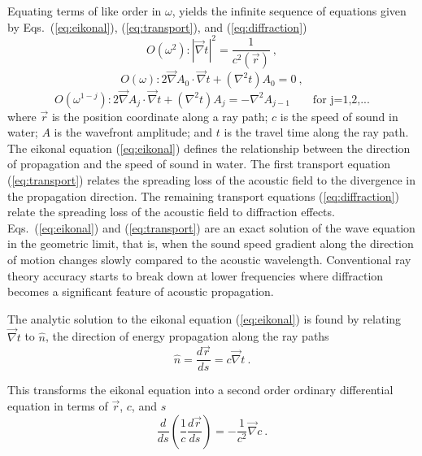\documentclass{ws-jca}
\begin{document}
Equating terms of like order in \(\omega\), yields the infinite sequence of
equations given by Eqs.~(\ref{eq:eikonal}), (\ref{eq:transport}), and
(\ref{eq:diffraction})
\begin{equation}
	O(\omega^2) : \left| \vec{\nabla}t \right|^2 = \frac{1}{c^2(\vec{r})} \:,
	\label{eq:eikonal}
\end{equation}
\begin{equation}
	O(\omega) : 2\vec{\nabla}A_0 \cdot \vec{\nabla}t + (\nabla^2t)A_0 = 0 \:,
	\label{eq:transport}
\end{equation}
\begin{equation}
	O(\omega^{1-j}) : 2\vec{\nabla}A_j \cdot \vec{\nabla}t + (\nabla^2t)A_j 
		= -\nabla^2 A_{j-1} \qquad \text{for j=1,2,...}
	\label{eq:diffraction}
\end{equation}
where 
\(\vec{r}\) is the position coordinate along a ray path;
$c$ is the speed of sound in water; 
$A$ is the wavefront amplitude; and 
$t$ is the travel time along the ray path. 
The eikonal equation (\ref{eq:eikonal}) defines the relationship between
the direction of propagation and the speed of sound in water. The first
transport equation (\ref{eq:transport}) relates the spreading loss of the
acoustic field to the divergence in the propagation direction. The
remaining transport equations (\ref{eq:diffraction}) relate the spreading
loss of the acoustic field to diffraction effects. Eqs.~(\ref{eq:eikonal})
and (\ref{eq:transport}) are an exact solution of the wave equation in the
geometric limit, that is, when the sound speed gradient along the direction
of motion changes slowly compared to the acoustic wavelength. Conventional ray theory accuracy
starts to break down at lower frequencies where diffraction becomes a
significant feature of acoustic propagation.

The analytic solution to the eikonal equation (\ref{eq:eikonal}) is
found\cite{Jensen1994} by relating \(\vec{\nabla}t\) to \(\hat{n}\), the
direction of energy propagation along the ray paths
\begin{equation}
	\hat{n} = \frac{d\vec{r}}{ds} = c \vec{\nabla}t \:.
	\label{eq:ray_paths}
\end{equation}

This transforms the eikonal equation into a second order ordinary
differential equation in terms of \(\vec{r}\), $c$, and $s$
\begin{equation}
	\frac{d}{ds} \left( \frac{1}{c} \frac{d\vec{r}}{ds} \right) 
		= -\frac{1}{c^2} \vec{\nabla}c \:.
	\label{eq:ode2}
\end{equation}
\end{document}
